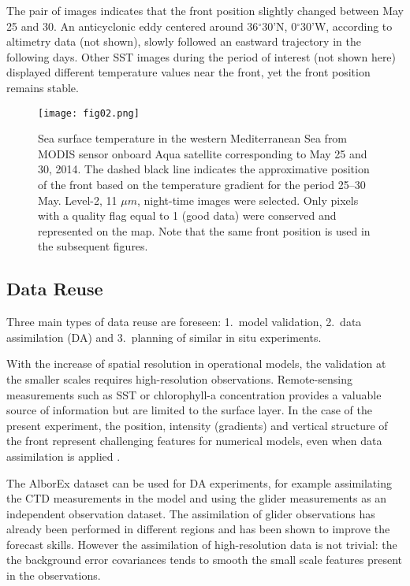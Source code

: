 \documentclass[essd,manuscript]{copernicus}
\begin{document}
The pair of images indicates that the front position slightly changed between May 25 and 30. An anticyclonic eddy centered around 36$^{\circ}$30'N, 0$^{\circ}$30'W, according to altimetry data (not shown), slowly followed an eastward trajectory in the following days. Other SST images during the period of interest (not shown here) displayed different temperature values near the front, yet the front position remains stable. 

\begin{figure}[t]
\texttt{[image: fig02.png]}
\caption{Sea surface temperature in the western Mediterranean Sea from MODIS sensor onboard Aqua satellite corresponding to May 25 and 30, 2014. The dashed black line indicates the approximative position of the front based on the temperature gradient for the period 25--30 May. Level-2, 11 $\mu m$, night-time images were selected. Only pixels with a quality flag equal to 1 (good data) were conserved and represented on the map. Note that the same front position is used in the subsequent figures.\label{fig2:SST}}
\end{figure}

\subsection{Data Reuse}

Three main types of data reuse are foreseen: 1.~model validation, 2.~data assimilation (DA) and 3.~planning of similar in situ experiments.

With the increase of spatial resolution in operational models, the validation at the smaller scales requires high-resolution observations. Remote-sensing measurements such as SST or chlorophyll-a concentration provides a valuable source of information but are limited to the surface layer. In the case of the present experiment, the position, intensity (gradients) and vertical structure of the front represent challenging features for numerical models, even when data assimilation is applied \citep{HERNANDEZ2018}.

The AlborEx dataset can be used for DA experiments, for example assimilating the CTD measurements in the model and using the glider measurements as an independent observation dataset. The assimilation of glider observations has already been performed in different regions \citep[e.g.][]{MELET2012,MOURRE2014,PAN2014} and has been shown to improve the forecast skills. However the assimilation of high-resolution data is not trivial: the the background error covariances tends to smooth the small scale features present in the observations.
\end{document}
